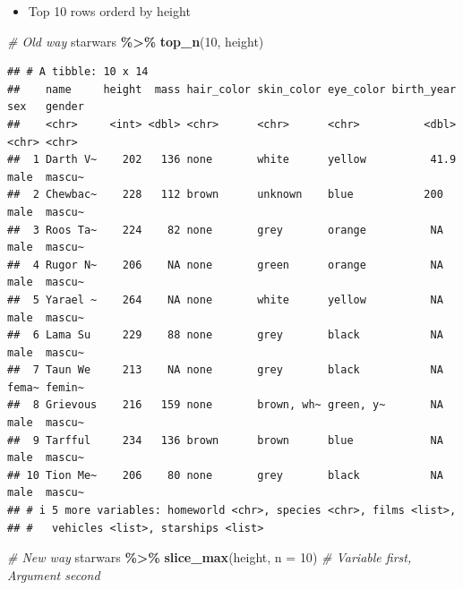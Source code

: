 \documentclass[
]{book}
\newenvironment{Shaded}{\begin{snugshade}}{\end{snugshade}}
\newcommand{\AttributeTok}[1]{\textcolor[rgb]{0.13,0.29,0.53}{#1}}
\newcommand{\CommentTok}[1]{\textcolor[rgb]{0.56,0.35,0.01}{\textit{#1}}}
\newcommand{\DecValTok}[1]{\textcolor[rgb]{0.00,0.00,0.81}{#1}}
\newcommand{\FunctionTok}[1]{\textcolor[rgb]{0.13,0.29,0.53}{\textbf{#1}}}
\newcommand{\NormalTok}[1]{#1}
\newcommand{\SpecialCharTok}[1]{\textcolor[rgb]{0.81,0.36,0.00}{\textbf{#1}}}
\providecommand{\tightlist}{%
  \setlength{\itemsep}{0pt}\setlength{\parskip}{0pt}}
\begin{document}
\begin{itemize}
\tightlist
\item
  Top 10 rows orderd by height
\end{itemize}

\begin{Shaded}
\begin{Highlighting}[]
\CommentTok{\# Old way}
\NormalTok{starwars }\SpecialCharTok{\%\textgreater{}\%}
  \FunctionTok{top\_n}\NormalTok{(}\DecValTok{10}\NormalTok{, height)}
\end{Highlighting}
\end{Shaded}

\begin{verbatim}
## # A tibble: 10 x 14
##    name     height  mass hair_color skin_color eye_color birth_year sex   gender
##    <chr>     <int> <dbl> <chr>      <chr>      <chr>          <dbl> <chr> <chr> 
##  1 Darth V~    202   136 none       white      yellow          41.9 male  mascu~
##  2 Chewbac~    228   112 brown      unknown    blue           200   male  mascu~
##  3 Roos Ta~    224    82 none       grey       orange          NA   male  mascu~
##  4 Rugor N~    206    NA none       green      orange          NA   male  mascu~
##  5 Yarael ~    264    NA none       white      yellow          NA   male  mascu~
##  6 Lama Su     229    88 none       grey       black           NA   male  mascu~
##  7 Taun We     213    NA none       grey       black           NA   fema~ femin~
##  8 Grievous    216   159 none       brown, wh~ green, y~       NA   male  mascu~
##  9 Tarfful     234   136 brown      brown      blue            NA   male  mascu~
## 10 Tion Me~    206    80 none       grey       black           NA   male  mascu~
## # i 5 more variables: homeworld <chr>, species <chr>, films <list>,
## #   vehicles <list>, starships <list>
\end{verbatim}

\begin{Shaded}
\begin{Highlighting}[]
\CommentTok{\# New way}
\NormalTok{starwars }\SpecialCharTok{\%\textgreater{}\%}
  \FunctionTok{slice\_max}\NormalTok{(height, }\AttributeTok{n =} \DecValTok{10}\NormalTok{) }\CommentTok{\# Variable first, Argument second}
\end{Highlighting}
\end{Shaded}
\end{document}
